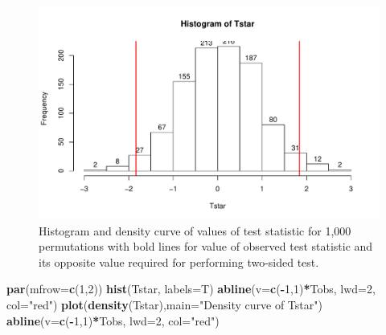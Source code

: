 \documentclass[]{book}
\newenvironment{Shaded}{\begin{snugshade}}{\end{snugshade}}
\newcommand{\KeywordTok}[1]{\textcolor[rgb]{0.13,0.29,0.53}{\textbf{#1}}}
\newcommand{\DataTypeTok}[1]{\textcolor[rgb]{0.13,0.29,0.53}{#1}}
\newcommand{\DecValTok}[1]{\textcolor[rgb]{0.00,0.00,0.81}{#1}}
\newcommand{\StringTok}[1]{\textcolor[rgb]{0.31,0.60,0.02}{#1}}
\newcommand{\OperatorTok}[1]{\textcolor[rgb]{0.81,0.36,0.00}{\textbf{#1}}}
\newcommand{\NormalTok}[1]{#1}
\theoremstyle{definition}
\theoremstyle{definition}
\theoremstyle{remark}
\begin{document}
\begin{figure}
\centering
\includegraphics{02-reintroductionToStatistics_files/figure-latex/Figure2-11-1.pdf}
\caption{\label{fig:Figure2-11}Histogram and density curve of values of test statistic
for 1,000 permutations with bold lines for value of observed test
statistic and its opposite value required for performing two-sided test.}
\end{figure}

\begin{Shaded}
\begin{Highlighting}[]
\KeywordTok{par}\NormalTok{(}\DataTypeTok{mfrow=}\KeywordTok{c}\NormalTok{(}\DecValTok{1}\NormalTok{,}\DecValTok{2}\NormalTok{))}
\KeywordTok{hist}\NormalTok{(Tstar, }\DataTypeTok{labels=}\NormalTok{T)}
\KeywordTok{abline}\NormalTok{(}\DataTypeTok{v=}\KeywordTok{c}\NormalTok{(}\OperatorTok{-}\DecValTok{1}\NormalTok{,}\DecValTok{1}\NormalTok{)}\OperatorTok{*}\NormalTok{Tobs, }\DataTypeTok{lwd=}\DecValTok{2}\NormalTok{, }\DataTypeTok{col=}\StringTok{"red"}\NormalTok{)}
\KeywordTok{plot}\NormalTok{(}\KeywordTok{density}\NormalTok{(Tstar),}\DataTypeTok{main=}\StringTok{"Density curve of Tstar"}\NormalTok{)}
\KeywordTok{abline}\NormalTok{(}\DataTypeTok{v=}\KeywordTok{c}\NormalTok{(}\OperatorTok{-}\DecValTok{1}\NormalTok{,}\DecValTok{1}\NormalTok{)}\OperatorTok{*}\NormalTok{Tobs, }\DataTypeTok{lwd=}\DecValTok{2}\NormalTok{, }\DataTypeTok{col=}\StringTok{"red"}\NormalTok{)}
\end{Highlighting}
\end{Shaded}
\end{document}
